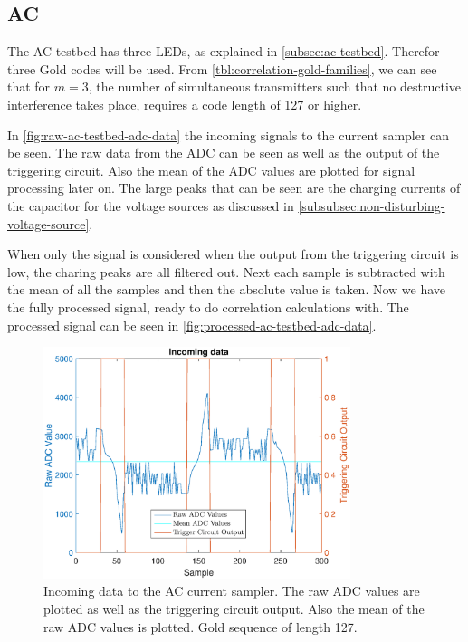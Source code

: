 
\subsection{AC}


The AC testbed has three LEDs, as explained in \autoref{subsec:ac-testbed}.
Therefor three Gold codes will be used.
From \autoref{tbl:correlation-gold-families}, we can see that for $m = 3$, the number of simultaneous transmitters such that no destructive interference takes place, requires a code length of 127 or higher.

In \autoref{fig:raw-ac-testbed-adc-data} the incoming signals to the current sampler can be seen.
The raw data from the ADC can be seen as well as the output of the triggering circuit.
Also the mean of the ADC values are plotted for signal processing later on.
The large peaks that can be seen are the charging currents of the capacitor for the voltage sources as discussed in \autoref{subsubsec:non-disturbing-voltage-source}.

When only the signal is considered when the output from the triggering circuit is low, the charing peaks are all filtered out.
Next each sample is subtracted with the mean of all the samples and then the absolute value is taken.
Now we have the fully processed signal, ready to do correlation calculations with.
The processed signal can be seen in \autoref{fig:processed-ac-testbed-adc-data}.



\begin{figure}
  \centering
  \includegraphics[width=0.8\textwidth]{chapters/evaluation-chapters/hardware/ac/raw-ac-testbed-adc-data.eps}
    \caption{Incoming data to the AC current sampler. The raw ADC values are plotted as well as the triggering circuit output. Also the mean of the raw ADC values is plotted. Gold sequence of length 127.}
  \label{fig:raw-ac-testbed-adc-data}
\end{figure}


